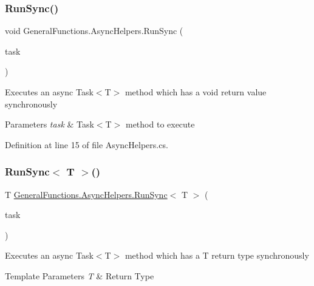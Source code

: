 \subsubsection{\texorpdfstring{Run\+Sync()}{RunSync()}}
{\footnotesize\ttfamily void General\+Functions.\+Async\+Helpers.\+Run\+Sync (\begin{DoxyParamCaption}\item[{Func$<$ Task $>$}]{task }\end{DoxyParamCaption})}



Execute\textquotesingle{}s an async Task$<$\+T$>$ method which has a void return value synchronously 


\begin{DoxyParams}{Parameters}
{\em task} & Task$<$\+T$>$ method to execute\\
\hline
\end{DoxyParams}


Definition at line 15 of file Async\+Helpers.\+cs.

\hypertarget{class_general_functions_1_1_async_helpers_ae84f4401c29817870b9a72ffbcfb41e5}{}\label{class_general_functions_1_1_async_helpers_ae84f4401c29817870b9a72ffbcfb41e5} 
\subsubsection{\texorpdfstring{Run\+Sync$<$ T $>$()}{RunSync< T >()}}
{\footnotesize\ttfamily T \hyperlink{class_general_functions_1_1_async_helpers_a1c9a89f4892028dd40a70752105b3f97}{General\+Functions.\+Async\+Helpers.\+Run\+Sync}$<$ T $>$ (\begin{DoxyParamCaption}\item[{Func$<$ Task$<$ T $>$$>$}]{task }\end{DoxyParamCaption})}



Execute\textquotesingle{}s an async Task$<$\+T$>$ method which has a T return type synchronously 


\begin{DoxyTemplParams}{Template Parameters}
{\em T} & Return Type\\
\hline
\end{DoxyTemplParams}

